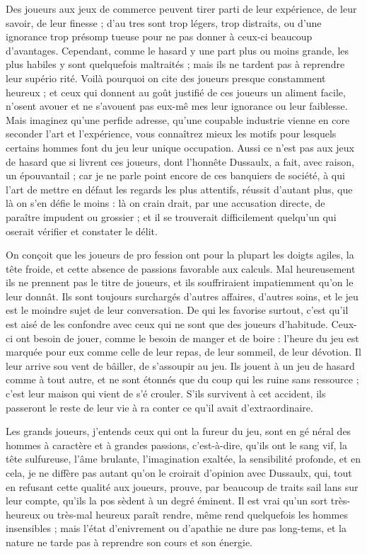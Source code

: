 Des joueurs aux jeux de commerce
peuvent tirer parti de leur expérience,
de leur savoir, de leur finesse ; d'au%
tres sont trop légers, trop distraits,
ou d'une ignorance trop présomp%
tueuse pour ne pas donner à ceux-ci
beaucoup d'avantages. Cependant,
comme le hasard y une part plus ou
moins grande, les plus habiles y sont
quelquefois maltraités ; mais ils ne
tardent pas à reprendre leur supério%
rité. Voilà pourquoi on cite des joueurs
presque constamment heureux ; et
ceux qui donnent au goût justifié de
ces joueurs un aliment facile, n'osent
avouer et ne s'avouent pas eux-mê%
mes leur ignorance ou leur faiblesse.
Mais imaginez qu'une perfide adresse,
qu'une coupable industrie vienne en%
core seconder l'art et l'expérience,
vous connaîtrez mieux les motifs pour
lesquels certains hommes font du jeu
leur unique occupation. Aussi ce n'est
pas aux jeux de hasard que si livrent
ces joueurs, dont l'honnête Dussaulx,
a fait, avec raison, un épouvantail ;
car je ne parle point encore de ces
banquiers de société, à qui l'art de
mettre en défaut les regards les plus
attentifs, réussit d'autant plus, que
là on s'en défie le moins : là on crain%
drait, par une accusation directe, de
paraître impudent ou grossier ; et il se
trouverait difficilement quelqu'un qui
oserait vérifier et constater le délit.

On conçoit que les joueurs de pro%
fession ont pour la plupart les doigts
agiles, la tête froide, et cette absence
de passions favorable aux calculs. Mal%
heureusement ils ne prennent pas le
titre de joueurs, et ils souffriraient
impatiemment qu'on le leur donnât.
Ils sont toujours surchargés d'autres
affaires, d'autres soins, et le jeu est
le moindre sujet de leur conversation.
De qui les favorise surtout, c'est qu'il
est aisé de les confondre avec ceux qui
ne sont que des joueurs d'habitude.
Ceux-ci ont besoin de jouer, comme le
besoin de manger et de boire : l'heure
du jeu est marquée pour eux comme
celle de leur repas, de leur sommeil,
de leur dévotion. Il leur arrive sou%
vent de bâiller, de s'assoupir au jeu.
Ils jouent à un jeu de hasard comme
à tout autre, et ne sont étonnés que
du coup qui les ruine sans ressource ;
c'est leur maison qui vient de s'é%
crouler. S'ils survivent à cet accident,
ils passeront le reste de leur vie à ra%
conter ce qu'il avait d'extraordinaire.

Les grands joueurs, j'entends ceux
qui ont la fureur du jeu, sont en gé%
néral des hommes à caractère et à
grandes passions, c'est-à-dire, qu'ils
ont le sang vif, la tête sulfureuse,
l'âme brulante, l'imagination exaltée,
la sensibilité profonde, et en cela, je
ne diffère pas autant qu'on le croirait
d'opinion avec Dussaulx, qui, tout
en refusant cette qualité aux joueurs,
prouve, par beaucoup de traits sail%
lans sur leur compte, qu'ils la pos%
sèdent à un degré éminent. Il est vrai
qu'un sort très-heureux ou très-mal%
heureux paraît rendre, même rend
quelquefois les hommes insensibles ;
mais l'état d'enivrement ou d'apathie
ne dure pas long-tems, et la nature
ne tarde pas à reprendre son cours et
son énergie.

